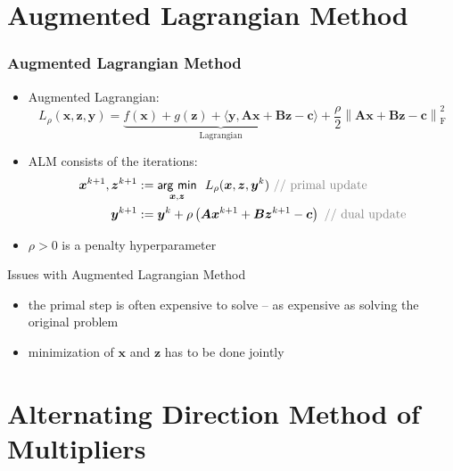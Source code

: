 \documentclass[aspectratio=169]{beamer}
\newcommand{\norm}[1]{\left\lVert#1\right\rVert}
\begin{document}
    \section*{Augmented Lagrangian Method}

    \begin{frame}
        \frametitle{Augmented Lagrangian Method}
        \begin{itemize}
          \item Augmented Lagrangian:
            \begin{equation*}
              L_{\rho}(\bm x, \bm z, \bm y) = \underbrace{f(\bm x) + g(\bm z) + \langle \bm y, \bm A\bm x + \bm B \bm z - \bm c \rangle}_{\text{Lagrangian}}
              + \dfrac{\rho}{2}\norm{\bm A\bm x + \bm B \bm z - \bm c}^2_{\mathrm{F}}
            \end{equation*}
          \item ALM consists of the iterations:
            \begin{align*}
              \bm x^{k+1}, \bm z^{k+1} & := \underset{\bm x, \bm z}{\textsf{arg min}}~~ L_{\rho}(\bm x, \bm z, \bm y^k) ~{\color{gray} \text{// primal update}}\\
              \bm y^{k+1} & := \bm y^k + \rho\left(\bm A\bm x^{k+1} + \bm B \bm z^{k+1} - \bm c\right) ~{\color{gray} \text{// dual update}}
            \end{align*}
          \item $\rho > 0$ is a penalty hyperparameter
        \end{itemize}
    \end{frame}

    \begin{frame}{Issues with Augmented Lagrangian Method}
      \begin{itemize}
        \item the primal step is often expensive to solve -- as expensive as solving the original problem
        \item minimization of $\bm x$ and $\bm z$ has to be done jointly
      \end{itemize}
    \end{frame}

    \section*{Alternating Direction Method of Multipliers}
\end{document}
